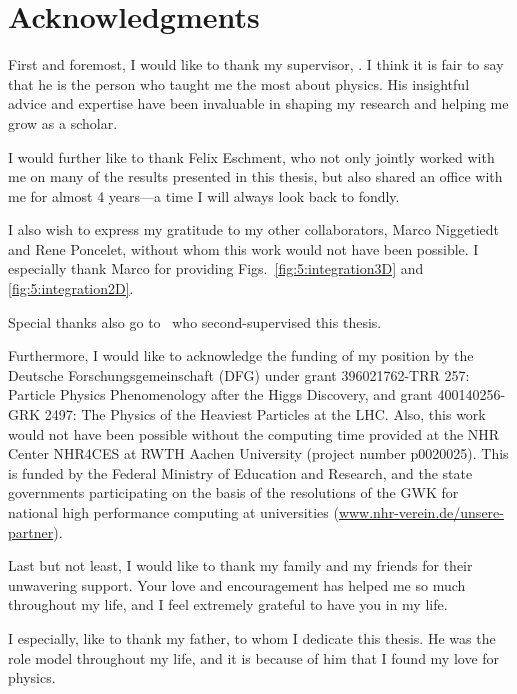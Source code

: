 
\begingroup
\let\clearpage\relax
\let\cleardoublepage\relax
\let\cleardoublepage\relax
\chapter*{Acknowledgments}

First and foremost, I would like to thank my supervisor, \mySupervisor. I think it is fair to say that he is the person who taught me the most about physics. His insightful advice and expertise have been invaluable in shaping my research and helping me grow as a scholar.

I would further like to thank Felix Eschment, who not only jointly worked with me on many of the results presented in this thesis, but also shared an office with me for almost 4 years---a time I will always look back to fondly.

I also wish to express my gratitude to my other collaborators, Marco Niggetiedt and Rene Poncelet, without whom this work would not have been possible. I especially thank Marco for providing Figs.~\ref{fig:5:integration3D} and \ref{fig:5:integration2D}.

Special thanks also go to \myOtherSupervisor\ who second-supervised this thesis.

Furthermore, I would like to acknowledge the funding of my position by the Deutsche Forschungsgemeinschaft (DFG) under grant 396021762-TRR 257: Particle Physics Phenomenology after the Higgs Discovery, and grant 400140256-GRK 2497: The Physics of the Heaviest Particles at the LHC. Also, this work would not have been possible without the computing time provided at the NHR Center NHR4CES at RWTH Aachen University (project number p0020025). This is funded by the Federal Ministry of Education and Research, and the state governments participating on the basis of the resolutions of the GWK for national high performance computing at universities (\url{www.nhr-verein.de/unsere-partner}).

Last but not least, I would like to thank my family and my friends for their unwavering support. Your love and encouragement has helped me so much throughout my life, and I feel extremely grateful to have you in my life.

I especially, like to thank my father, to whom I dedicate this thesis. He was the role model throughout my life, and it is because of him that I found my love for physics.

\endgroup
